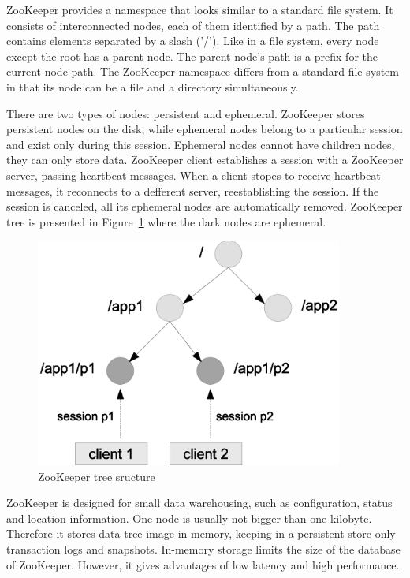 ZooKeeper provides a namespace that looks similar to a standard file system.
It consists of interconnected nodes, each of them identified by a path.
The path contains elements separated by a slash ('/').
Like in a file system, every node except the root has a parent node.
The parent node's path is a prefix for the current node path.
The ZooKeeper namespace differs from a standard file system in that its node can be a file and a directory simultaneously.

There are two types of nodes: persistent and ephemeral.
ZooKeeper stores persistent nodes on the disk, while ephemeral nodes belong to a particular session and exist only during this session.
Ephemeral nodes cannot have children nodes, they can only store data.
ZooKeeper client establishes a session with a ZooKeeper server, passing heartbeat messages.
When a client stopes to receive heartbeat messages, it reconnects to a defferent server, reestablishing the session.
If the session is canceled, all its ephemeral nodes are automatically removed.
ZooKeeper tree is presented in Figure~\ref{fig:zookeeper_tree} where the dark nodes are ephemeral.

\begin{figure}
  \centering
  \includegraphics [width=0.9\textwidth]{images/zookeeper_tree}
  \caption{ZooKeeper tree sructure}
  \label{fig:zookeeper_tree}
\end{figure}

ZooKeeper is designed for small data warehousing, such as configuration, status and location information.
One node is usually not bigger than one kilobyte.
Therefore it stores data tree image in memory, keeping in a persistent store only transaction logs and snapshots.
In-memory storage limits the size of the database of ZooKeeper.
However, it gives advantages of low latency and high performance. 

